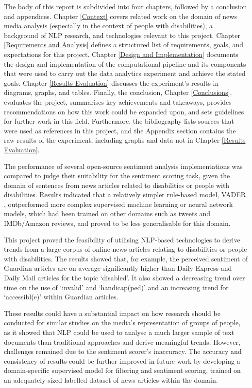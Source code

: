 \documentclass{report}
\begin{document}
The body of this report is subdivided into four chapters, followed by a conclusion and appendices.
Chapter \ref{Context} covers related work on the domain of news media analysis (especially in the context of people with disabilities), a background of NLP research, and technologies relevant to this project.
Chapter \ref{Requirements and Analysis} defines a structured list of requirements, goals, and expectations for this project.
Chapter \ref{Design and Implementation} documents the design and implementation of the computational pipeline and its components that were used to carry out the data analytics experiment and achieve the stated goals.
Chapter \ref{Results Evaluation} discusses the experiment's results in diagrams, graphs, and tables.
Finally, the conclusion, Chapter \ref{Conclusions}, evaluates the project, summarises key achievements and takeaways, provides recommendations on how this work could be expanded upon, and sets guidelines for further work in this field.
Furthermore, the bibliography lists sources that were used as references in this project, and the Appendix section contains the raw results of the experiment, including graphs and data not in Chapter \ref{Results Evaluation}.

The performance of several open-source sentiment analysis implementations was compared to judge their suitability for the sentiment scoring task, given the domain of sentences from news articles related to disabilities or people with disabilities.
Results indicated that a relatively simpler rule-based model, VADER \cite{VADER}, outperformed more complex supervised machine learning or neural network models, which had been trained on other domains such as tweets and IMDb/Amazon reviews, and proved to be less generalisable for this domain.

This project proved the feasibility of utilising NLP-based technologies to derive trends from a large corpus of online news articles relating to disabilities or people with disabilities.
The results showed that, for example, the perceived sentiment of Guardian articles are on average significantly higher than Daily Express and Daily Mail articles for the topic `disabled'.
It also showed a decreasing trend over time on the use of `invalid' and `handicap(ped)' and an increasing trend for `accessibl(e)' within Guardian articles.

These results could have a substantial impact on how research should be conducted for similar studies on the media's representation of groups of people, as it showed that NLP could be used to analyse a much larger sample of text documents than traditional approaches and derive meaningful trends.
However, challenges remained due to the sentiment scorer's inaccuracy.
The accuracy and consistency of results could be further improved in future work by developing a domain-specific supervised model for filtering and sentiment scoring, trained on an adequately-sized labelled dataset of news articles within the domain.   
\end{document}
